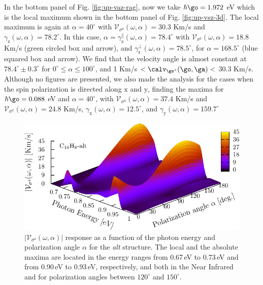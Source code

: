 \documentclass[prb,11pt,tightenlines,twocolumn,aps]{revtex4-1}
\begin{document}
In the bottom panel of Fig. \ref{fig:up-vaz-rag}, now we take
$\hbar\go=1.972$ eV which is the local maximum 
shown in the bottom panel of Fig. \ref{fig:up-vsz-3d}. 
The local maximum is
again at  $\alpha = 40^{\circ}$ with
$\mathcal{V}_{\sigma^{\mathrm{z}}} (\omega,\alpha) =
30.3$ Km/s and $\gamma_{\mathrm{z}}(\omega,\alpha) =
78.2^{\circ}$.
% 
In this case,  
$\alpha =\gamma_{\mathrm{z}}^\parallel(\omega,\alpha) = 78.4^{\circ}$ with
$\mathcal{V}_{\sigma^{\mathrm{z}}}(\omega,\alpha) =18.8$ Km/s 
(green circled box and arrow),
and
% 
$\gamma_{\mathrm{z}}^\perp(\omega,\alpha) = 78.5^{\circ}$, for 
$\alpha =168.5^ {\circ}$ 
(blue squared box and arrow).
% 
We find  that the velocity angle is almost constant at
$78.4^{\circ}\pm 0.3^\circ$ 
for  $0^{\circ} \leq
\alpha \leq 100^{\circ}$,
and 1 Km/s $<\calv_{\gs^z}(\go,\ga)<$ 30.3 Km/s.
% 
Although no figures are presented, we also made the analysis for the
cases when the spin polarization is directed 
along $\mathrm{x}$ and $\mathrm{y}$, finding 
the maxima for
$\hbar\go=0.088$ eV and $\alpha=40^{\circ}$, with
$\mathcal{V}_{\sigma^{\mathrm{x}}}(\omega,\alpha)=37.4$ Km/s and
$\mathcal{V}_{\sigma^{\mathrm{y}}}(\omega,\alpha)=24.8$ Km/s,
$\gamma_{\mathrm{x}}(\omega,\alpha) = 12.5^{\circ}$, and 
$\gamma_{\mathrm{y}}(\omega,\alpha) = 159.7^{\circ}$


\begin{figure}[tb]
    \centering
    \includegraphics[width=\linewidth]{altplots/alt-3d-svaz}
    \caption{$|\mathcal{V}_{\sigma^{\mathrm{z}}}(\omega,\alpha)|$ response
    as a function of the photon energy and polarization angle $\alpha$  for the
    \emph{alt} structure. The local and the absolute maxima are located in the
    energy ranges from 0.67\,eV to 0.73\,eV and from 0.90\,eV to 0.93\,eV,
    respectively, and both in the Near Infrared and for polarization angles
    between $120^{\circ}$ and $150^{\circ}$.}
    \label{fig:alt-3d-vsb}
\end{figure}
\end{document}
